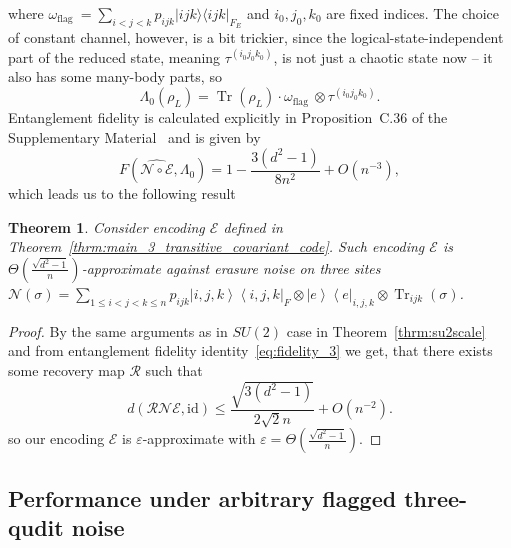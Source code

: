 \documentclass[10pt,twocolumn,superscriptaddress,aps,amsmath,amssymb,citeautoscript,floatfix,prx,longbibliography]{revtex4-2}
\newtheorem{theorem}{Theorem}
\theoremstyle{plain}
\theoremstyle{plain}
\theoremstyle{plain}
\theoremstyle{plain}
\theoremstyle{plain}
\theoremstyle{plain}
\begin{document}
where $\omega_{\text {flag }}=\sum_{i<j<k} p_{i j k}|i j k\rangle\langle i j k|_{F_E}$ and $i_0, j_0, k_0$ are fixed indices. The choice of constant channel, however, is a bit trickier, since the logical-state-independent part of the reduced state, meaning $\tau^{(i_0j_0k_0)}$, is not just a chaotic state now -- it also has some many-body parts, so
\[
\Lambda_0(\rho_L)=\operatorname{Tr}(\rho_L)\cdot\omega_{\text{flag }} \otimes \tau^{(i_0j_0k_0)}.
\]
Entanglement fidelity is calculated explicitly in Proposition~C.36 of the Supplementary Material~\cite{SuppMat} and is given by
\begin{equation}\label{eq:fidelity_3}
   F\left(\widehat{\mathcal{N} \circ \mathcal{E}}, \Lambda_0\right)=1-\frac{3\left(d^2-1\right)}{8n^2}+O\left(n^{-3}\right), 
\end{equation}
which leads us to the following result
\begin{theorem}
    Consider encoding $\mathcal{E}$ defined in Theorem~\ref{thrm:main_3_transitive_covariant_code}. Such encoding $\mathcal{E}$ is $\Theta\left(\frac{\sqrt{d^2-1}}{n}\right)$-approximate against erasure noise on three sites $\mathcal{N}(\sigma)=\sum_{1 \leq i<j<k \leq n} p_{i j k} \left|i, j, k\right\rangle\left\langle i, j, k\right|_F \otimes \left| e\right\rangle\left\langle e\right|_{i, j, k} \otimes \operatorname{Tr}_{i j k}(\sigma)$.
\end{theorem}

\begin{proof}
By the same arguments as in $SU(2)$ case in Theorem~\ref{thrm:su2scale} and from entanglement fidelity identity~\eqref{eq:fidelity_3} we get, that there exists some recovery map $\mathcal{R}$ such that
\[
    d(\mathcal{R} \mathcal{N} \mathcal{E}, \mathrm{id}) \leq \frac{\sqrt{3(d^2-1)}}{2\sqrt{2}n}+O\left(n^{-2}\right).
\]
so our encoding $\mathcal{E}$ is $\varepsilon$-approximate with $\varepsilon=\Theta\left(\frac{\sqrt{d^2-1}}{n}\right)$.
\end{proof}

\subsection{Performance under arbitrary flagged three-qudit noise}\label{subsec:main_arb_3_noise}
\end{document}
